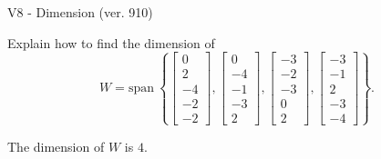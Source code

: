 \begin{exercise}
  \begin{exerciseTitle}V8 - Dimension (ver. 910)\end{exerciseTitle}
  \begin{exerciseStatement}
    Explain how to find the dimension of 
\[W=\mathrm{span}\ \left\{\left[\begin{array}{r}
0 \\
2 \\
-4 \\
-2 \\
-2
\end{array}\right] , \left[\begin{array}{r}
0 \\
-4 \\
-1 \\
-3 \\
2
\end{array}\right] , \left[\begin{array}{r}
-3 \\
-2 \\
-3 \\
0 \\
2
\end{array}\right] , \left[\begin{array}{r}
-3 \\
-1 \\
2 \\
-3 \\
-4
\end{array}\right]\right\}.\]



  \end{exerciseStatement}
  \begin{exerciseAnswer}
   The dimension of \(W\) is  \(4\).
  


  \end{exerciseAnswer}
\end{exercise}